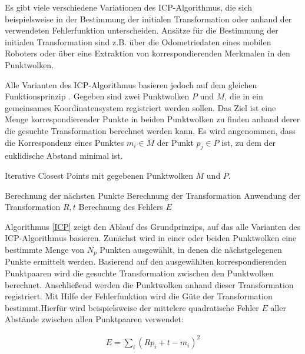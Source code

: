 Es gibt viele verschiedene Variationen des ICP-Algorithmus, die sich beispielsweise in der Bestimmung der initialen Transformation oder anhand der verwendeten Fehlerfunktion unterscheiden. Ansätze für die Bestimmung der initialen Transformation sind z.B. über die Odometriedaten eines mobilen Roboters oder über eine Extraktion von korrespondierenden Merkmalen in den Punktwolken.

Alle Varianten des ICP-Algorithmus basieren jedoch auf dem gleichen Funk\-tions\-prin\-zip \cite{Rusinkiewicz2001}. 
Gegeben sind zwei Punktwolken $ P $ und $ M $, die in ein gemeinsames Koordinatensystem registriert werden sollen. Das Ziel ist eine Menge kor\-res\-pon\-die\-ren\-der Punkte in beiden Punktwolken zu finden anhand derer die gesuchte Transformation berechnet werden kann. Es wird angenommen, dass die Korrespondenz eines Punktes $ m_i \in M $ der Punkt $ p_j \in P $ ist, zu dem der euklidische Abstand minimal ist. 

\begin{algorithm}
	\caption{Iterative Closest Points mit gegebenen Punktwolken $ M $ und $ P $.}
	\label{ICP}
	\begin{algorithmic}[1]
				\State Berechnung der nächsten Punkte
				\State Berechnung der Transformation
				\State Anwendung der Transformation $ R,t $
				\State Berechnung des Fehlers $ E $
			\EndWhile
			\State {}
		\EndFunction
	\end{algorithmic}
\end{algorithm}

Algorithmus \ref{ICP} zeigt den Ablauf des Grundprinzips, auf das alle Varianten des ICP-Algorithmus basieren. Zunächst wird in einer oder beiden Punktwolken eine bestimmte Menge von $ N_p $ Punkten ausgewählt, in denen die nächstgelegenen Punkte ermittelt werden. 
Basierend auf den ausgewählten korrespondierenden Punktpaaren wird die gesuchte Transformation zwischen den Punktwolken berechnet. Anschließend werden die Punktwolken anhand dieser Transformation registriert. Mit Hilfe der Fehlerfunktion wird die Güte der Transformation bestimmt.Hierfür wird beispielsweise der mittelere quadratische Fehler $ E $ aller Abstände zwischen allen Punktpaaren verwendet: 

\begin{align}
	E = \sum_i(Rp_i+t-m_i)^2
\end{align}

